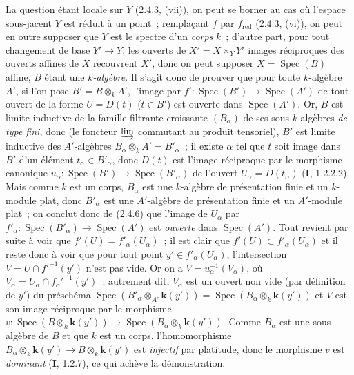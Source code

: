 La question étant locale sur $Y$ (2.4.3, (vii)), on peut se borner au cas où
l'espace sous-jacent $Y$ est réduit à un point~; remplaçant $f$ par
$f_{\mathrm{red}}$ (2.4.3, (vi)), on peut en outre supposer que $Y$ est le
spectre d'un \emph{corps} $k$~; d'autre part, pour tout changement de base
$Y'\to Y$, les ouverts de $X'=X\times_Y Y'$ images réciproques des ouverts
affines de $X$ recouvrent $X'$, donc on peut supposer
$X=\operatorname{Spec}(B)$ affine, $B$ étant une \emph{$k$-algèbre}. Il s'agit donc
de prouver que pour toute $k$-algèbre $A'$, si l'on pose
$B'=B\otimes_k A'$, l'image par
$f':\operatorname{Spec}(B')\to\operatorname{Spec}(A')$ de tout ouvert de la
forme $U=D(t)$ ($t\in B'$) est ouverte dans $\operatorname{Spec}(A')$. Or,
$B$ est limite inductive de la famille filtrante croissante $(B_\alpha)$ de
ses sous-$k$-algèbres \emph{de type fini}, donc (le foncteur
$\varinjlim$ commutant au produit tensoriel), $B'$ est limite inductive des
$A'$-algèbres $B_\alpha\otimes_k A'=B'_\alpha$~; il existe $\alpha$ tel que
$t$ soit image dans $B'$ d'un élément $t_\alpha\in B'_\alpha$, donc $D(t)$
est l'image réciproque par le morphisme canonique
$u_\alpha:\operatorname{Spec}(B')\to\operatorname{Spec}(B'_\alpha)$ de
l'ouvert $U_\alpha=D(t_\alpha)$ (\textbf{I}, 1.2.2.2). Mais comme $k$ est un corps,
$B_\alpha$ est une $k$-algèbre de présentation finie et un $k$-module plat,
donc $B'_\alpha$ est une $A'$-algèbre de présentation finie et un $A'$-module
plat~; on conclut donc de (2.4.6) que l'image de $U_\alpha$ par
$f'_\alpha:\operatorname{Spec}(B'_\alpha)\to\operatorname{Spec}(A')$ est
\emph{ouverte} dans $\operatorname{Spec}(A')$. Tout revient par suite à voir
que $f'(U)=f'_\alpha(U_\alpha)$~; il est clair que
$f'(U)\subset f'_\alpha(U_\alpha)$ et il reste donc à voir que pour tout point
$y'\in f'_\alpha(U_\alpha)$, l'intersection
$V=U\cap f'^{-1}(y')$ n'est pas vide. Or on a
$V=u_\alpha^{-1}(V_\alpha)$, où
$V_\alpha=U_\alpha\cap f_\alpha'^{-1}(y')$~; autrement dit, $V_\alpha$ est
un ouvert non vide (par définition de $y'$) du préschéma
$\operatorname{Spec}(B'_\alpha\otimes_{A'}\boldsymbol{k}(y'))
=\operatorname{Spec}(B_\alpha\otimes_k \boldsymbol{k}(y'))$
et $V$ est son image réciproque par le morphisme
$v:\operatorname{Spec}(B\otimes_k \boldsymbol{k}(y'))
\longrightarrow\operatorname{Spec}(B_\alpha\otimes_k \boldsymbol{k}(y'))$.
Comme $B_\alpha$ est une sous-algèbre de $B$ et que $k$ est un corps,
l'homomorphisme
$B_\alpha\otimes_k \boldsymbol{k}(y')\to B\otimes_k \boldsymbol{k}(y')$
est \emph{injectif} par platitude, donc le morphisme $v$ est \emph{dominant}
(\textbf{I}, 1.2.7), ce qui achève la démonstration.

